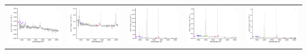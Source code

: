 \begin{center}
\begin{longtable}{l l l l l }
    \includegraphics[width=0.19\linewidth, clip]{Figs/Figs-sdss/spec-9409-58051-0225-STRIPE82-0015-053521.pdf} & \includegraphics[width=0.19\linewidth, clip]{Figs/Figs-sdss/spec-9409-58051-0529-STRIPE82-0014-019228.pdf} & \includegraphics[width=0.19\linewidth, clip]{Figs/Figs-sdss/spec-0330-52370-0471-SPLUS-n03s21-043085.pdf} & \includegraphics[width=0.19\linewidth, clip]{Figs/Figs-sdss/spec-0331-52368-0215-SPLUS-n03s23-001039.pdf} & \includegraphics[width=0.19\linewidth, clip]{Figs/Figs-sdss/spec-0331-52368-0449-SPLUS-n02s23-034336.pdf} \\

\end{longtable}
\end{center}
